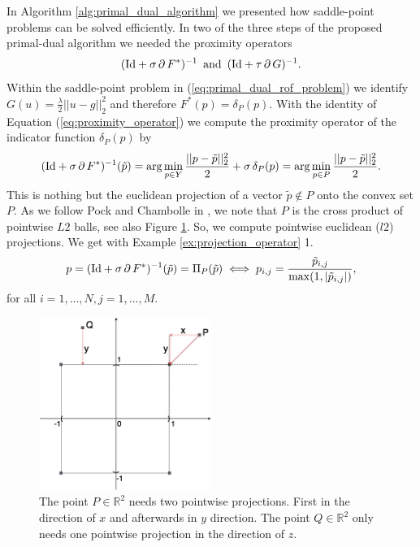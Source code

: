 \documentclass[abstracton]{scrreprt}
\begin{document}
            In Algorithm \ref{alg:primal_dual_algorithm} we presented how saddle-point problems can be solved efficiently. In two of the three steps of the proposed primal-dual algorithm we needed the proximity operators
                $$
                    (\textnormal{Id} + \sigma\,\partial\,F^{\ast})^{-1} \,\,\, \textnormal{and} \,\,\, (\textnormal{Id} + \tau\,\partial\,G)^{-1}.
                $$
            Within the saddle-point problem in (\ref{eq:primal_dual_rof_problem}) we identify $G(u) = \frac{\lambda}{2} ||u - g||_{2}^{2}$ and therefore $F^{\ast}(p) = \delta_{P}(p)$. With the identity of Equation (\ref{eq:proximity_operator}) we compute the proximity operator of the indicator function $\delta_{P}(p)$ by
                $$
                    (\textnormal{Id} + \sigma\,\partial\,F^{\ast})^{-1}(\tilde{p}) = \arg \min_{p \in Y} \frac{||p - \tilde{p}||_{2}^{2}}{2} + \sigma\,\delta_{P}(p) = \arg \min_{p \in P} \frac{||p - \tilde{p}||_{2}^{2}}{2}.
                $$
            This is nothing but the euclidean projection of a vector $\tilde{p} \notin P$ onto the convex set $P$. As we follow Pock and Chambolle in \cite{Chambolle10afirst-order}, we note that $P$ is the cross product of pointwise $L2$ balls, see also Figure \ref{fig:pointwise_l2_projections}. So, we compute pointwise euclidean ($l2$) projections. We get with Example \ref{ex:projection_operator} 1.
                $$
                    p = (\textnormal{Id} + \sigma\,\partial\,F^{\ast})^{-1}(\tilde{p}) = \Pi_{P}(\tilde{p}) \iff p_{i,j} = \frac{\tilde{p}_{i, j}}{\max(1, |\tilde{p}_{i, j}|)},
                $$
            for all $i = 1, ..., N, j = 1, ..., M$.
            \begin{figure}[!ht]
                \centering
                \includegraphics[width=0.5\textwidth]{img/pointwise_projection.png}
                \caption[Pointwise $l2$ projections.]{The point $P \in \mathbb{R}^{2}$ needs two pointwise projections. First in the direction of $x$ and afterwards in $y$ direction. The point $Q \in \mathbb{R}^{2}$ only needs one pointwise projection in the direction of $z$.}
                \label{fig:pointwise_l2_projections}
            \end{figure}
\end{document}
